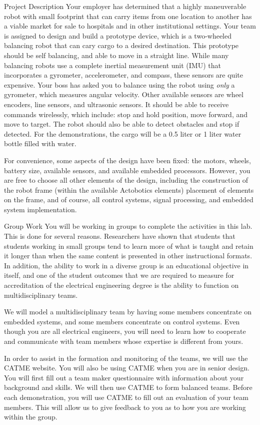 \begin{frame}{Project Description}
Your employer has determined that a highly maneuverable robot with small footprint that can carry items from one location to another has a viable market for sale to hospitals and in other institutional settings. Your team is assigned to design and build a prototype device, which is a two-wheeled balancing robot that can cary cargo to a desired destination. This prototype should be self balancing, and able to move in a straight line. While many balancing robots use a complete inertial measurement unit (IMU) that incorporates a gyrometer, accelerometer, and compass, these sensors are quite expensive. Your boss has asked you to balance using the robot using {\em only} a gyrometer, which measures angular velocity. Other available sensors are wheel encoders, line sensors, and ultrasonic sensors. It should be able to receive commands wirelessly, which include: stop and hold position, move forward, and move to target. The robot should also be able to detect obstacles and stop if detected.  For the demonstrations, the cargo will be a 0.5 liter or 1 liter water bottle filled with water. 

For convenience, some aspects of the design have been fixed: the motors, wheels, battery size, available sensors, and available embedded processors. However, you are free to choose all other elements of the design, including the construction of the robot frame (within the available Actobotics elements) placement of elements on the frame, and of course, all control systems, signal processing, and embedded system implementation.  
\end{frame}

\begin{frame}{Group Work}
You will be working in groups to complete the activities in this lab. This is done for several reasons. Researchers have shown that students that students working in small groups tend to learn more of what is taught and retain it longer than when the same content is presented in other instructional formats. In addition, the ability to work in a diverse group is an educational objective in itself, and one of the student outcomes that we are required to measure for accreditation of the electrical engineering degree is the ability to function on multidisciplinary teams. 

We will model a multidisciplinary team by having some members concentrate on embedded systems, and some members concentrate on control systems. Even though you are all electrical engineers, you will need to learn how to cooperate and communicate with team members whose expertise is different from yours. 

In order to assist in the formation and monitoring of the teams, we will use the CATME website. You will also be using CATME when you are in senior design. You will first fill out a team maker questionnaire with information about your background and skills.  We will then use CATME to form balanced teams. Before each demonstration, you will use CATME to fill out an evaluation of your team members. This will allow us to give feedback to you as to how you are working within the group. 
\end{frame}


